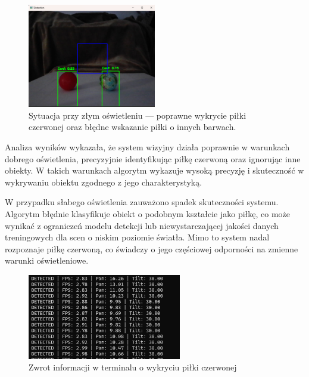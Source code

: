 \documentclass[a4paper,twoside,12pt]{book}
\begin{document}
\begin{figure}[!hb]
    \centering
    \includegraphics[width=0.5\textwidth]{Images/Porownanie/Yolo7 robot/Zrzut ekranu 2025-01-02 194208.png}
    \caption{Sytuacja przy złym oświetleniu — poprawne wykrycie piłki czerwonej oraz błędne wskazanie piłki o innych barwach.}
    \label{fig:Wykrycie_piłki2}
\end{figure}

\newpage
Analiza wyników wykazała, że system wizyjny działa poprawnie w warunkach dobrego oświetlenia, precyzyjnie identyfikując piłkę czerwoną oraz ignorując inne obiekty. W takich warunkach algorytm wykazuje wysoką precyzję i skuteczność w wykrywaniu obiektu zgodnego z jego charakterystyką. 

W przypadku słabego oświetlenia zauważono spadek skuteczności systemu. Algorytm błędnie klasyfikuje obiekt o podobnym kształcie jako piłkę, co może wynikać z ograniczeń modelu detekcji lub niewystarczającej jakości danych treningowych dla scen o niskim poziomie światła. Mimo to system nadal rozpoznaje piłkę czerwoną, co świadczy o jego częściowej odporności na zmienne warunki oświetleniowe.

\begin{figure}[!hb]
    \centering
    \includegraphics[width=0.6\textwidth]{Images/Porownanie/Yolo7 robot/Para pilek ciemno poprawnie wskazal czerwona.png}
    \caption{Zwrot informacji w terminalu o wykryciu piłki czerwonej}
    \label{fig:TerminalOutput}
\end{figure}
\end{document}
